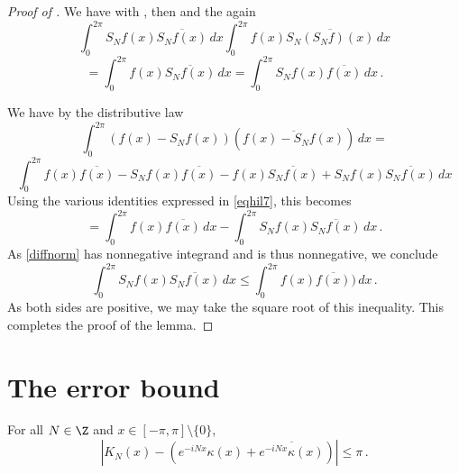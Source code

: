 \begin{proof}[Proof of ]

We have with , then  and the  again
\begin{equation*}
 \int_0^{2\pi} S_Nf(x)\overline{S_Nf(x)}\, dx
 \int_0^{2\pi} f(x)\overline{S_N(S_Nf)(x)}\, dx
\end{equation*}
\begin{equation}\label{eqhil7}
 =\int_0^{2\pi} f(x)\overline{S_Nf(x)}\, dx=
 \int_0^{2\pi} S_N f(x)\overline{f(x)}\, dx\, .
\end{equation}

We have by the distributive law
\begin{equation}\label{diffnorm}
    \int_0^{2\pi} (f(x)-S_Nf(x))(\overline{f(x)-S_Nf(x)})\, dx=
\end{equation}
\begin{equation*}
 \int_0^{2\pi} f(x)\overline{f(x)}
    -S_Nf(x)\overline{f(x)}
   -f(x)\overline{S_Nf(x)}
     + S_Nf(x)\overline{S_Nf(x)}\, dx
\end{equation*}
Using the various identities expressed in \eqref{eqhil7}, this becomes
\begin{equation}
 =\int_0^{2\pi} f(x)\overline{f(x)}\, dx
    -
   \int_0^{2\pi} S_Nf(x)\overline{S_Nf(x)}\, dx\, .
\end{equation}
As \eqref{diffnorm} has nonnegative integrand and is thus nonnegative, we conclude
\begin{equation}
  \int_0^{2\pi} S_Nf(x)\overline{S_Nf(x)}\, dx\le
 \int_0^{2\pi} f(x)\overline{f(x)})\, dx\, .
\end{equation}
As both sides are positive, we may take the square root of this inequality.
This completes the proof of the lemma.
\end{proof}




\section{The error bound}
\label{10difference}

\begin{lemma}
    \label{Dirichlet-Hilbert}
    \leanok
    For all $N\in\Z$ and $x\in [-\pi,\pi] \setminus \{0\}$,
    \begin{equation*}
        \left|K_N(x) - (e^{-iNx}\kappa(x) + \overline{e^{-iNx}\kappa(x)})\right| \le \pi \,.
    \end{equation*}
\end{lemma}

